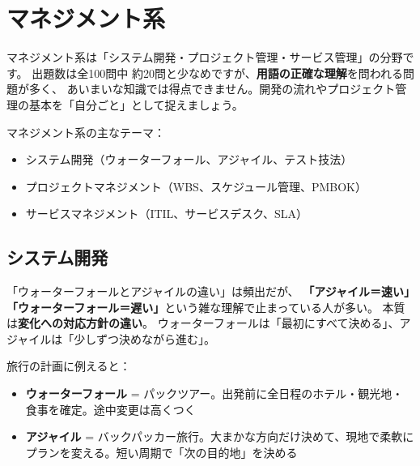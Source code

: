 \chapter{マネジメント系}

マネジメント系は「システム開発・プロジェクト管理・サービス管理」の分野です。
出題数は全100問中 約20問と少なめですが、\textbf{用語の正確な理解}を問われる問題が多く、
あいまいな知識では得点できません。開発の流れやプロジェクト管理の基本を「自分ごと」として捉えましょう。

\begin{keypoint}
マネジメント系の主なテーマ：
\begin{itemize}
  \item システム開発（ウォーターフォール、アジャイル、テスト技法）
  \item プロジェクトマネジメント（WBS、スケジュール管理、PMBOK）
  \item サービスマネジメント（ITIL、サービスデスク、SLA）
\end{itemize}
\end{keypoint}

\section{システム開発}

\mondaipage
{}

\begin{stumble}
「ウォーターフォールとアジャイルの違い」は頻出だが、
\textbf{「アジャイル＝速い」「ウォーターフォール＝遅い」}という雑な理解で止まっている人が多い。
本質は\textbf{変化への対応方針の違い}。
ウォーターフォールは「最初にすべて決める」、アジャイルは「少しずつ決めながら進む」。
\end{stumble}

\begin{analogy}
旅行の計画に例えると：
\begin{itemize}
  \item \textbf{ウォーターフォール} = パックツアー。出発前に全日程のホテル・観光地・食事を確定。途中変更は高くつく
  \item \textbf{アジャイル} = バックパッカー旅行。大まかな方向だけ決めて、現地で柔軟にプランを変える。短い周期で「次の目的地」を決める
\end{itemize}
\end{analogy}

